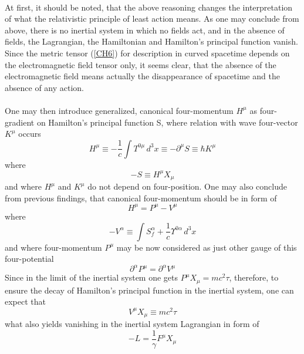 \documentclass[aps,prx,preprint,groupedaddress,showkeys]{revtex4-2}
\begin{document}
~\\
At first, it should be noted, that the above reasoning changes the interpretation of what the relativistic principle of least action means. As one may conclude from above, there is no inertial system in which no fields act, and in the absence of fields, the Lagrangian, the Hamiltonian and Hamilton's principal function vanish. Since the metric tensor (\ref{CH6}) for description in curved spacetime depends on the electromagnetic field tensor only, it seems clear, that the absence of the electromagnetic field means actually the disappearance of spacetime and the absence of any action.\\
~\\
One may then introduce generalized, canonical four-momentum $H^{\mu}$ as four-gradient on Hamilton's principal function S, where relation with wave four-vector $K^{\mu}$ occurs 
\begin{equation} \label{Q2}
H^{\mu} \equiv - \frac{1}{c} \int T^{0 \mu} \, d^3 x \equiv -\partial^{\mu} S \equiv \hbar  K^{\mu}
\end{equation}
where 
\begin{equation} \label{Q2a}
- S \equiv H^{\mu}X_{\mu}
\end{equation}
and where $H^{\mu}$ and $K^{\mu}$ do not depend on four-position. One may also conclude from previous findings, that canonical four-momentum should be in form of
\begin{equation} \label{Q5}
H^{\mu} = P^{\mu} - V^{\mu} 
\end{equation}
where 
\begin{equation} \label{CD1}
- V^{\alpha} \equiv \int S_f^{\alpha} + \frac{1}{c} \Upsilon^{0 \alpha} \, d^3 x
\end{equation}
and where four-momentum $P^{\mu}$ may be now considered as just other gauge of this four-potential 
\begin{equation} \label{Q5b}
\partial^{\alpha} P^{\mu} = \partial^{\alpha} V^{\mu}
\end{equation}
Since in the limit of the inertial system one gets $P^{\mu} X_{\mu} = mc^2\tau$, therefore, to ensure the decay of Hamilton's principal function in the inertial system, one can expect that
\begin{equation} \label{Q1}
V^{\mu} X_{\mu} \equiv mc^2 \tau 
\end{equation}
what also yields vanishing in the inertial system Lagrangian in form of
\begin{equation} \label{Q4}
- L = \frac{1}{\gamma} F^{\mu} X_{\mu} 
\end{equation}
\end{document}
